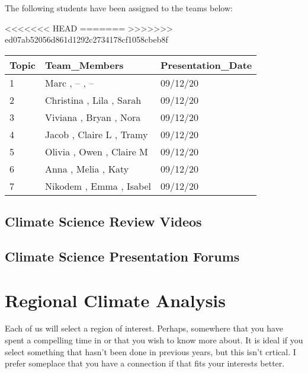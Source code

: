 \documentclass{article}\usepackage[]{graphicx}\usepackage[]{color}
\begin{document}
{\color{red}The following students have been assigned to the teams below:

<<<<<<< HEAD
=======
>>>>>>> ed07ab52056d861d1292c2734178cf1058cbeb8f
\begin{table}[ht]
\centering
\begin{tabular}{lll}
  \hline
Topic & Team\_Members & Presentation\_Date \\ 
  \hline
1 & Marc ,  -- ,  -- & 09/12/20 \\ 
  2 & Christina ,  Lila ,  Sarah & 09/12/20 \\ 
  3 & Viviana ,  Bryan ,  Nora & 09/12/20 \\ 
  4 & Jacob ,  Claire L ,  Tramy & 09/12/20 \\ 
  5 & Olivia ,  Owen ,  Claire M & 09/12/20 \\ 
  6 & Anna ,  Melia ,  Katy & 09/12/20 \\ 
  7 & Nikodem ,  Emma ,  Isabel & 09/12/20 \\ 
   \hline
\end{tabular}
\end{table}

}
\subsection{Climate Science Review {\color{red}Videos}}




%

\subsection{Climate Science Presentation Forums}



\section{Regional Climate Analysis}

Each of us will select a region of interest. Perhaps, somewhere that you have spent a compelling time in or that you wish to know more about. It is ideal if you select something that hasn't been done in previous years, but this isn't crtical. I prefer someplace that you have a connection if that fits your interests better. %
\end{document}
